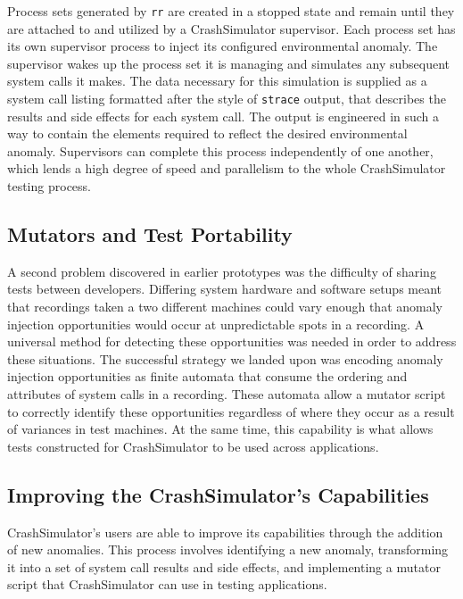 Process sets generated by {\tt rr} are created in a stopped state and
remain until they are attached to and utilized by a CrashSimulator
supervisor.  Each process set has its own supervisor process to inject
its configured environmental anomaly.  The
supervisor wakes up the process set it is managing and simulates any
subsequent system calls it makes.  The data necessary for this
simulation is
supplied as a system call listing formatted after the style of {\tt strace}
output, that describes the results and side effects for each system
call. The output is engineered in such a way to contain the
elements required to reflect the
desired environmental anomaly.  Supervisors can complete this
process independently of one another, which lends a
high degree of speed and
parallelism to the whole CrashSimulator testing process.


\subsection{Mutators and Test Portability}

A second problem discovered in earlier prototypes was the difficulty of
sharing tests between developers.  Differing system hardware and software
setups meant that recordings taken a two different machines could vary
enough that anomaly injection opportunities would occur at unpredictable
spots in a recording.  A universal method for detecting these opportunities
was needed in order to address these situations.  The successful strategy
we landed upon was encoding anomaly injection opportunities as finite
automata that consume the ordering and attributes of system calls in a
recording.  These automata allow a mutator script to correctly identify
these opportunities regardless of where they occur as a result of variances
in test machines.  At the same time, this capability is what allows tests
constructed for CrashSimulator to be used across applications.


\subsection{Improving the CrashSimulator's Capabilities}
\label{sec-improving-tool}

CrashSimulator's users are able to improve its capabilities through
the addition of new anomalies.  This process involves identifying a new
anomaly, transforming it into a set of system call results and side
effects, and implementing a mutator script that CrashSimulator can use in
testing applications.

